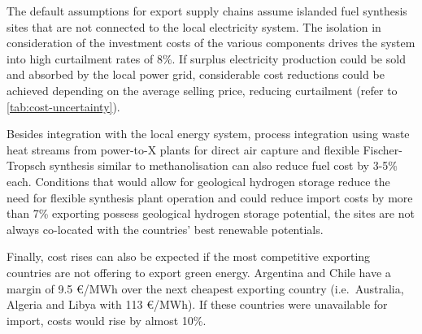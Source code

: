 The default assumptions for export supply chains assume islanded fuel synthesis
sites that are not connected to the local electricity system. The isolation in
consideration of the investment costs of the various components drives the
system into high curtailment rates of 8\%. If surplus electricity production
could be sold and absorbed by the local power grid, considerable cost reductions
could be achieved depending on the average selling price, reducing curtailment
(refer to \cref{tab:cost-uncertainty}). 

Besides integration with the local energy system, process integration using
waste heat streams from power-to-X plants for direct air capture and flexible
Fischer-Tropsch synthesis similar to methanolisation can also reduce fuel cost
by 3-5\% each. Conditions that would allow for geological hydrogen storage
reduce the need for flexible synthesis plant operation and could reduce import
costs by more than 7\% %
exporting possess geological hydrogen storage potential, the sites are not
always co-located with the countries' best renewable potentials.
\cite{hevinUndergroundStorage2019}

Finally, cost rises can also be expected if the most competitive exporting
countries are not offering to export green energy. Argentina and Chile have a
margin of 9.5 \euro{}/MWh over the next cheapest exporting country
(i.e.~Australia, Algeria and Libya with 113 \euro{}/MWh). If these countries
were unavailable for import, costs would rise by almost 10\%.


